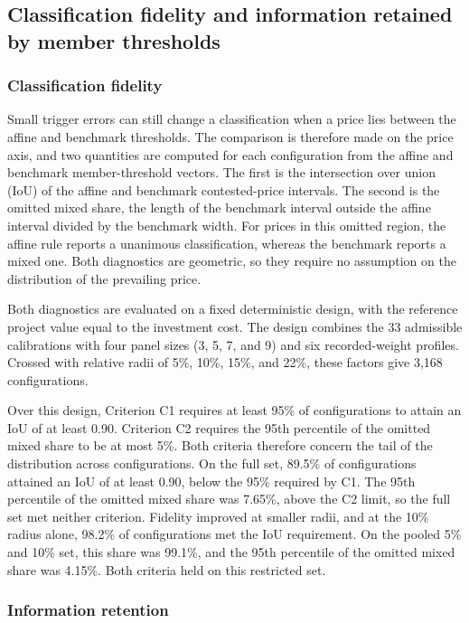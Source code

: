\documentclass[5p,times,authoryear]{elsarticle}
\theoremstyle{plain}
\begin{document}
\subsection{Classification fidelity and information retained by member thresholds}

\subsubsection{Classification fidelity}

Small trigger errors can still change a classification when a price lies between the affine and benchmark thresholds. The comparison is therefore made on the price axis, and two quantities are computed for each configuration from the affine and benchmark member-threshold vectors. The first is the intersection over union (IoU) of the affine and benchmark contested-price intervals. The second is the omitted mixed share, the length of the benchmark interval outside the affine interval divided by the benchmark width. For prices in this omitted region, the affine rule reports a unanimous classification, whereas the benchmark reports a mixed one. Both diagnostics are geometric, so they require no assumption on the distribution of the prevailing price.

Both diagnostics are evaluated on a fixed deterministic design, with the reference project value equal to the investment cost. The design combines the 33 admissible calibrations with four panel sizes (3, 5, 7, and 9) and six recorded-weight profiles. Crossed with relative radii of 5\%, 10\%, 15\%, and 22\%, these factors give 3,168 configurations.

Over this design, Criterion C1 requires at least 95\% of configurations to attain an IoU of at least 0.90. Criterion C2 requires the 95th percentile of the omitted mixed share to be at most 5\%. Both criteria therefore concern the tail of the distribution across configurations. On the full set, 89.5\% of configurations attained an IoU of at least 0.90, below the 95\% required by C1. The 95th percentile of the omitted mixed share was 7.65\%, above the C2 limit, so the full set met neither criterion. Fidelity improved at smaller radii, and at the 10\% radius alone, 98.2\% of configurations met the IoU requirement. On the pooled 5\% and 10\% set, this share was 99.1\%, and the 95th percentile of the omitted mixed share was 4.15\%. Both criteria held on this restricted set.

\subsubsection{Information retention}
\end{document}
